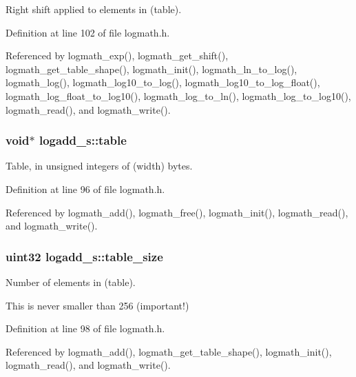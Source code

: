 Right shift applied to elements in (table). 



Definition at line 102 of file logmath.\+h.



Referenced by logmath\+\_\+exp(), logmath\+\_\+get\+\_\+shift(), logmath\+\_\+get\+\_\+table\+\_\+shape(), logmath\+\_\+init(), logmath\+\_\+ln\+\_\+to\+\_\+log(), logmath\+\_\+log(), logmath\+\_\+log10\+\_\+to\+\_\+log(), logmath\+\_\+log10\+\_\+to\+\_\+log\+\_\+float(), logmath\+\_\+log\+\_\+float\+\_\+to\+\_\+log10(), logmath\+\_\+log\+\_\+to\+\_\+ln(), logmath\+\_\+log\+\_\+to\+\_\+log10(), logmath\+\_\+read(), and logmath\+\_\+write().

\subsubsection[{table}]{\setlength{\rightskip}{0pt plus 5cm}void$\ast$ logadd\+\_\+s\+::table}\label{structlogadd__s_a27793577d513d85cd73c2daffc140695}


Table, in unsigned integers of (width) bytes. 



Definition at line 96 of file logmath.\+h.



Referenced by logmath\+\_\+add(), logmath\+\_\+free(), logmath\+\_\+init(), logmath\+\_\+read(), and logmath\+\_\+write().

\subsubsection[{table\+\_\+size}]{\setlength{\rightskip}{0pt plus 5cm}uint32 logadd\+\_\+s\+::table\+\_\+size}\label{structlogadd__s_a484c53a05b46d863d0456af679cee5d8}


Number of elements in (table). 

This is never smaller than 256 (important!) 

Definition at line 98 of file logmath.\+h.



Referenced by logmath\+\_\+add(), logmath\+\_\+get\+\_\+table\+\_\+shape(), logmath\+\_\+init(), logmath\+\_\+read(), and logmath\+\_\+write().

